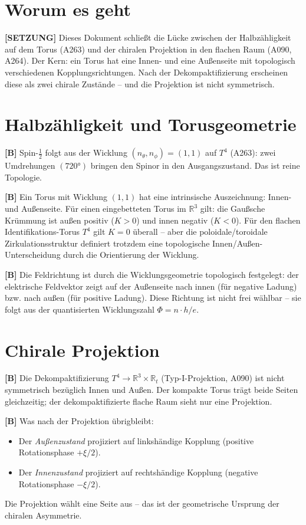 \section{Worum es geht}

\textbf{[SETZUNG]} Dieses Dokument schließt die Lücke zwischen der
Halbzähligkeit auf dem Torus (A263) und der chiralen Projektion in den
flachen Raum (A090, A264). Der Kern: ein Torus hat eine Innen- und eine
Außenseite mit topologisch verschiedenen Kopplungsrichtungen. Nach der
Dekompaktifizierung erscheinen diese als zwei chirale Zustände -- und
die Projektion ist nicht symmetrisch.

\section{Halbzähligkeit und Torusgeometrie}

\textbf{[B]} Spin-$\tfrac12$ folgt aus der Wicklung $(n_\theta,n_\phi)=(1,1)$
auf $T^4$ (A263): zwei Umdrehungen $(720°)$ bringen den Spinor in den
Ausgangszustand. Das ist reine Topologie.

\textbf{[B]} Ein Torus mit Wicklung $(1,1)$ hat eine intrinsische
Auszeichnung: Innen- und Außenseite. Für einen eingebetteten Torus im
$\mathbb{R}^3$ gilt: die Gaußsche Krümmung ist außen positiv ($K>0$) und
innen negativ ($K<0$). Für den flachen Identifikations-Torus $T^4$ gilt
$K=0$ überall -- aber die poloidale/toroidale Zirkulationsstruktur definiert
trotzdem eine topologische Innen/Außen-Unterscheidung durch die Orientierung
der Wicklung.

\textbf{[B]} Die Feldrichtung ist durch die Wicklungsgeometrie topologisch
festgelegt: der elektrische Feldvektor zeigt auf der Außenseite nach innen
(für negative Ladung) bzw. nach außen (für positive Ladung). Diese Richtung
ist nicht frei wählbar -- sie folgt aus der quantisierten Wicklungszahl
$\Phi=n\cdot h/e$.

\section{Chirale Projektion}

\textbf{[B]} Die Dekompaktifizierung $T^4\to\mathbb{R}^3\times\mathbb{R}_t$
(Typ-I-Projektion, A090) ist nicht symmetrisch bezüglich Innen und Außen.
Der kompakte Torus trägt beide Seiten gleichzeitig; der dekompaktifizierte
flache Raum sieht nur eine Projektion.

\textbf{[B]} Was nach der Projektion übrigbleibt:
\begin{itemize}[leftmargin=2em,itemsep=2pt,topsep=2pt]
  \item Der \emph{Außenzustand} projiziert auf linkshändige Kopplung
    (positive Rotationsphase $+\xi/2$).
  \item Der \emph{Innenzustand} projiziert auf rechtshändige Kopplung
    (negative Rotationsphase $-\xi/2$).
\end{itemize}
Die Projektion wählt eine Seite aus -- das ist der geometrische Ursprung
der chiralen Asymmetrie.

